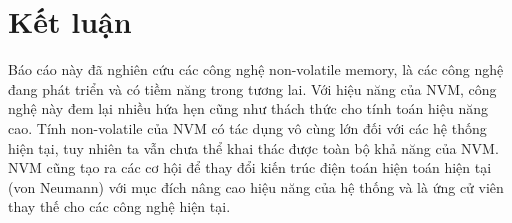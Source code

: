 \section{Kết luận}
Báo cáo này đã nghiên cứu các công nghệ non-volatile memory, là các công nghệ
đang phát triển và có tiềm năng trong tương lai. Với hiệu năng của NVM, công
nghệ này đem lại nhiều hứa hẹn cũng như thách thức cho tính toán hiệu năng cao.
Tính non-volatile của NVM có tác dụng vô cùng lớn đối với các hệ thống hiện tại,
tuy nhiên ta vẫn chưa thể khai thác được toàn bộ khả năng của NVM. NVM cũng tạo
ra các cơ hội để thay đổi kiến trúc điện toán hiện toán hiện tại (von Neumann)
với mục đích nâng cao hiệu năng của hệ thống và là ứng cử viên thay thế cho các
công nghệ hiện tại.